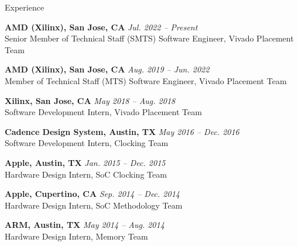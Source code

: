 \begin{rSection}{Experience}


{\bf AMD (Xilinx), San Jose, CA} \hfill {\em Jul. 2022 -- Present} \\
Senior Member of Technical Staff (SMTS) Software Engineer, Vivado Placement Team

{\bf AMD (Xilinx), San Jose, CA} \hfill {\em Aug. 2019 -- Jun. 2022} \\
Member of Technical Staff (MTS) Software Engineer, Vivado Placement Team

{\bf Xilinx, San Jose, CA} \hfill {\em May 2018 -- Aug. 2018} \\
Software Development Intern, Vivado Placement Team
    
{\bf Cadence Design System, Austin, TX} \hfill {\em May 2016 -- Dec. 2016} \\
Software Development Intern, Clocking Team

{\bf Apple, Austin, TX} \hfill {\em Jan. 2015 -- Dec. 2015} \\
Hardware Design Intern, SoC Clocking Team

{\bf Apple, Cupertino, CA} \hfill {\em Sep. 2014 -- Dec. 2014} \\
Hardware Design Intern, SoC Methodology Team

{\bf ARM, Austin, TX} \hfill {\em May 2014 -- Aug. 2014} \\
Hardware Design Intern, Memory Team


\end{rSection}

